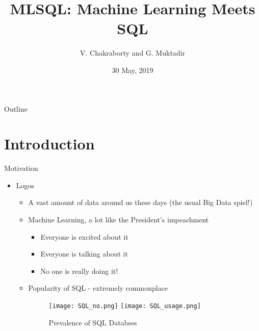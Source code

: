 \documentclass{beamer}
\title{MLSQL: Machine Learning Meets SQL}
\subtitle{}
\author{V. Chakraborty and G. Muktadir
}
\institute[Uni. of California] %
{
  \inst{}%
  \textit{CMPS 203, Spring 2019}\\
 }
\date{30 May, 2019}
\begin{document}
\begin{frame}
  \titlepage
\end{frame}

\begin{frame}{Outline}
  \tableofcontents
\end{frame}

\section{Introduction}
\begin{frame}{Motivation}{}
  \begin{itemize}
  \item<1-> {
   Logos
   \begin{itemize}
       \item<1->  A vast amount of data around us these days (the usual Big Data spiel!)
       \vspace{.2in}
       \item<2-> Machine Learning, a lot like the President's impeachment
        \begin{itemize}
            \item<3-> Everyone is excited about it 
            \item<4-> Everyone is talking about it
            \item<5-> No one is really doing it!
        \end{itemize}
        \vspace{.2in}
       \item<6-> Popularity of SQL - extremely commonplace
       \begin{figure}
           \centering
           \texttt{[image: SQL\_no.png]}
           \texttt{[image: SQL\_usage.png]}
           \caption{Prevalence of SQL Databses}
           \label{fig:sql_prev}
       \end{figure}
   \end{itemize}
  }

  \end{itemize}
\end{frame}
\end{document}
